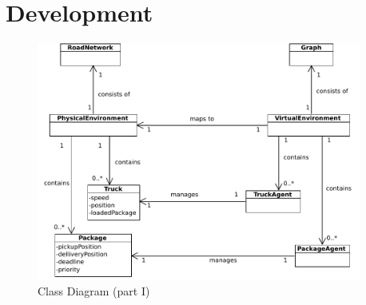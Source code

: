 \section{Development}


\begin{figure}[!h]
        \vspace{0.5pt}
        \begin{center}
                \includegraphics[width = 0.95\textwidth]{./diagrams/DomainModel.pdf}
		\end{center}
		\caption{Class Diagram (part I)}
		\label{Fig:DomainModel}
        \vspace{0.5pt}
\end{figure}

